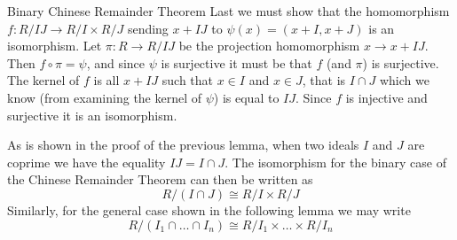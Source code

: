 \begin{lemma}{Binary Chinese Remainder Theorem}
    Last we must show that the homomorphism $f\colon R/IJ\to R/I\times R/J$ sending $x+IJ$ to $\psi(x)=(x+I,x+J)$ is an isomorphism.
    Let $\pi\colon R\to R/IJ$ be the projection homomorphism $x\to x+IJ$.
    Then $f\circ\pi=\psi$, and since $\psi$ is surjective it must be that $f$ (and $\pi$) is surjective.
    The kernel of $f$ is all $x+IJ$ such that $x\in I$ and $x\in J$, that is $I\cap J$ which we know (from examining the kernel of $\psi$) is equal to $IJ$.
    Since $f$ is injective and surjective it is an isomorphism.
\end{lemma}

\begin{note}
    As is shown in the proof of the previous lemma, when two ideals $I$ and $J$ are coprime we have the equality $IJ=I\cap J$.
    The isomorphism for the binary case of the Chinese Remainder Theorem can then be written as
    \begin{equation}
        R/(I\cap J)\cong R/I\times R/J
    \end{equation}
    Similarly, for the general case shown in the following lemma we may write
    \begin{equation}
        R/(I_1\cap\dots\cap I_n)\cong R/I_1\times\dots\times R/I_n
    \end{equation}
\end{note}

